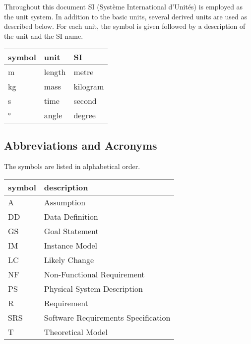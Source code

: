 \documentclass[12pt, titlepage]{article}
\begin{document}
Throughout this document SI (Syst\`{e}me International d'Unit\'{e}s) is
employed as the unit system. In addition to the basic units, several derived
units are
used as described below.  For each unit, the symbol is given followed by a
description of the unit and the SI name.\\

\renewcommand{\arraystretch}{1.2}
  \noindent \begin{tabular}{l l l} 
    \toprule		
    \textbf{symbol} & \textbf{unit} & \textbf{SI}\\
    \midrule 
    \si{\metre} & length & metre\\
    \si{\kilogram} & mass & kilogram\\
    \si{\second} & time & second\\
    \si{\degree} & angle & degree\\
    \bottomrule
  \end{tabular}

\subsection{Abbreviations and Acronyms}

The symbols are listed in alphabetical order.\\

\renewcommand{\arraystretch}{1.2}
\begin{tabular}{l l} 
  \toprule		
  \textbf{symbol} & \textbf{description}\\
  \midrule 
  A & Assumption\\
  DD & Data Definition\\
  GS & Goal Statement\\
  IM & Instance Model\\
  LC & Likely Change\\
  NF & Non-Functional Requirement\\
  PS & Physical System Description\\
  R & Requirement\\
  SRS & Software Requirements Specification\\
  T & Theoretical Model\\
  \bottomrule
\end{tabular}\\

\tableofcontents

\listoftables


\newpage
\end{document}
